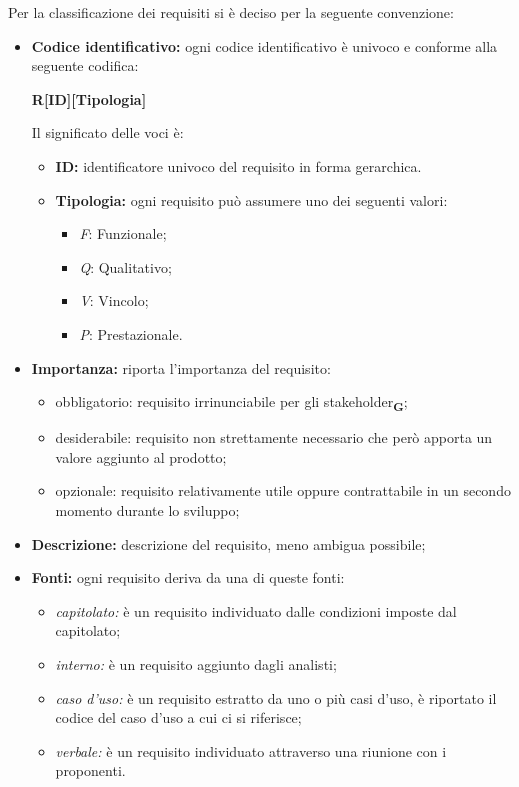 Per la classificazione dei requisiti si è deciso per la seguente convenzione:
\begin{itemize}
    \item \textbf{Codice identificativo:} ogni codice identificativo è univoco e conforme alla seguente codifica:
          \begin{center}
              \textbf{R[ID][Tipologia]}
          \end{center}
          Il significato delle voci è:
          \begin{itemize}
              \item \textbf{ID:} identificatore univoco del requisito in forma gerarchica.
              \item \textbf{Tipologia:} ogni requisito può assumere uno dei seguenti valori:
                    \begin{itemize}
                        \item \textit{F}: Funzionale;
                        \item \textit{Q}: Qualitativo;
                        \item \textit{V}: Vincolo;
                        \item \textit{P}: Prestazionale.
                    \end{itemize}
          \end{itemize}

    \item \textbf{Importanza:} riporta l'importanza del requisito:
          \begin{itemize}
              \item obbligatorio: requisito irrinunciabile per gli stakeholder\textsubscript{\textbf{G}};
              \item desiderabile: requisito non strettamente necessario che però apporta un valore aggiunto al prodotto;
              \item opzionale: requisito relativamente utile oppure contrattabile in un secondo momento durante lo sviluppo;
          \end{itemize}
    \item \textbf{Descrizione:} descrizione del requisito, meno ambigua possibile;
    \item \textbf{Fonti:} ogni requisito deriva da una di queste fonti:
          \begin{itemize}
              \item \textit{capitolato:} è un requisito individuato dalle condizioni imposte dal capitolato;
              \item \textit{interno:} è un requisito aggiunto dagli analisti;
              \item \textit{caso d'uso:} è un requisito estratto da uno o più casi d'uso, è riportato il codice del caso d'uso a cui ci si riferisce;
              \item \textit{verbale:} è un requisito individuato attraverso una riunione con i proponenti.
          \end{itemize}
\end{itemize}
